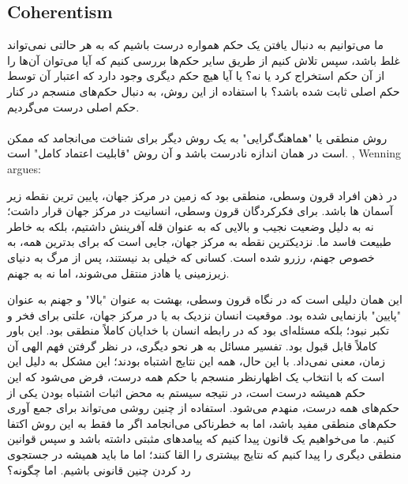 \documentclass[10pt,a4paper]{article}
\begin{document}
                \subsection{Coherentism}
ما می‌توانیم به دنبال یافتن یک حکم همواره درست باشیم که به هر حالتی نمی‌تواند غلط باشد، سپس تلاش کنیم از طریق سایر حکم‌ها بررسی کنیم که آیا می‌توان آن‌ها را از آن حکم استخراج کرد یا نه؟ یا آیا هیچ حکم دیگری وجود دارد که اعتبار آن توسط حکم اصلی ثابت شده باشد؟ با استفاده از این روش، به دنبال حکم‌های منسجم در کنار حکم اصلی درست می‌گردیم. 
                \\
                \\
                روش منطقی یا "هماهنگ‌گرایی" به یک روش دیگر برای شناخت می‌انجامد که ممکن است در همان اندازه نادرست باشد و آن روش "قابلیت اعتماد کامل" است. \cite{CW/E}, Wenning argues:
                \begin{qt}
در ذهن افراد قرون وسطی، منطقی بود که زمین در مرکز جهان، پایین ترین نقطه زیر آسمان ها باشد. برای فکرکردگان قرون وسطی، انسانیت در مرکز جهان قرار داشت؛ نه به دلیل وضعیت نجیب و بالایی که به عنوان قله آفرینش داشتیم، بلکه به خاطر طبیعت فاسد ما. نزدیک­ترین نقطه به مرکز جهان، جایی است که برای بدترین همه، به خصوص جهنم، رزرو شده است. کسانی که خیلی بد نیستند، پس از مرگ به دنیای زیرزمینی یا هادز منتقل می‌شوند، اما نه به جهنم.
                \end{qt}
این همان دلیلی است که در نگاه قرون وسطی، بهشت به عنوان "بالا" و جهنم به عنوان "پایین" بازنمایی شده بود. موقعیت انسان نزدیک به یا در مرکز جهان، علتی برای فخر و تکبر نبود؛ بلکه مسئله‌ای بود که در رابطه انسان با خدایان کاملاً منطقی بود. این باور کاملاً قابل قبول بود. تفسیر مسائل به هر نحو دیگری، در نظر گرفتن فهم الهی آن زمان، معنی نمی‌داد. با این حال، همه این نتایج اشتباه بودند؛ این مشکل به دلیل این است که با انتخاب یک اظهارنظر منسجم با حکم همه درست، فرض می‌شود که این حکم همیشه درست است، در نتیجه سیستم به محض اثبات اشتباه بودن یکی از حکم‌های همه درست، منهدم می‌شود. استفاده از چنین روشی می‌تواند برای جمع آوری حکم‌های منطقی مفید باشد، اما به خطرناکی می‌انجامد اگر ما فقط به این روش اکتفا کنیم. ما می‌خواهیم یک قانون پیدا کنیم که پیامدهای مثبتی داشته باشد و سپس قوانین منطقی دیگری را پیدا کنیم که نتایج بیشتری را القا کنند؛ اما ما باید همیشه در جستجوی رد کردن چنین قانونی باشیم. اما چگونه؟
                
\end{document}
